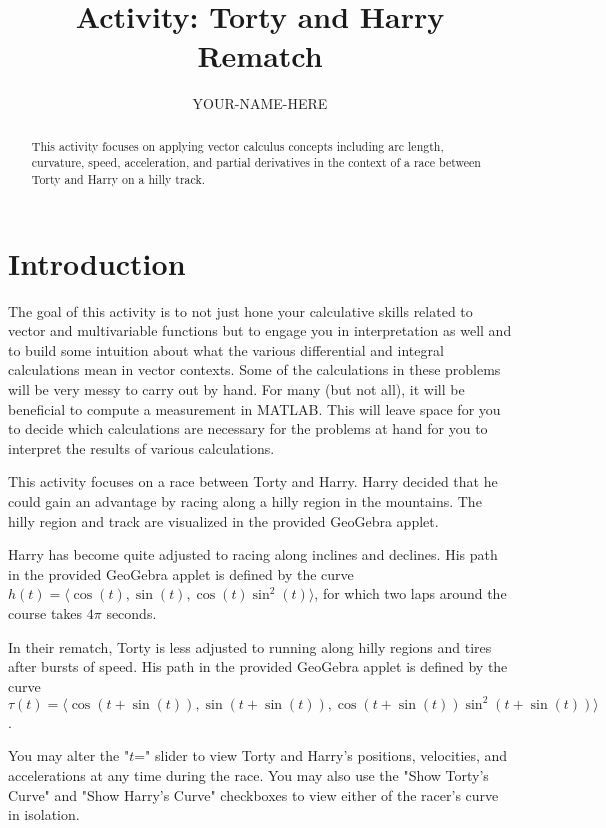\documentclass{ximera}
\title{Activity: Torty and Harry Rematch}
\author{YOUR-NAME-HERE}
\begin{document}
\begin{abstract}
This activity focuses on applying vector calculus concepts including arc length, curvature, speed, acceleration, and partial derivatives in the context of a race between Torty and Harry on a hilly track.
\end{abstract}
\maketitle

\section{Introduction}

The goal of this activity is to not just hone your calculative skills related to vector and multivariable functions but to engage you in interpretation as well and to build some intuition about what the various differential and integral calculations mean in vector contexts. Some of the calculations in these problems will be very messy to carry out by hand. For many (but not all), it will be beneficial to compute a measurement in MATLAB. This will leave space for you to decide which calculations are necessary for the problems at hand for you to interpret the results of various calculations.

This activity focuses on a race between Torty and Harry. Harry decided that he could gain an advantage by racing along a hilly region in the mountains. The hilly region and track are visualized in the provided GeoGebra applet.

Harry has become quite adjusted to racing along inclines and declines. His path in the provided GeoGebra applet is defined by the curve $h(t)=\langle \cos(t), \sin(t), \cos(t)\sin^2(t)\rangle$, for which two laps around the course takes $4 \pi$ seconds.

In their rematch, Torty is less adjusted to running along hilly regions and tires after bursts of speed. His path in the provided GeoGebra applet is defined by the curve $\tau (t)=\langle \cos(t+\sin(t)), \sin(t+\sin(t)), \cos(t+\sin(t))\sin^2(t+\sin(t))\rangle$.

You may alter the "$t$=" slider to view Torty and Harry's positions, velocities, and accelerations at any time during the race. You may also use the "Show Torty's Curve" and "Show Harry's Curve" checkboxes to view either of the racer's curve in isolation.

\begin{center}
\end{center}
\end{document}

